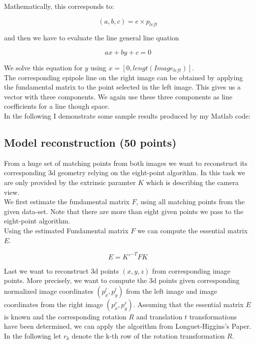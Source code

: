 \documentclass{paper}
\begin{document}
Mathematically, this corresponds to:

\begin{equation}
    (a,b,c) = e \times p_{left}
\end{equation}

and then we have to evaluate the line general line quation 

\begin{equation}
    ax + by + c = 0
\end{equation}

We solve this equation for $y$ using $x = [0,lengt(Image_{left})]$. \\

The corresponding epipole line on the right image can be obtained by applying the fundamental matrix to the point selected in the left image. This gives us a vector with three components. We again use these three components as line coefficients for a line though space. \\

In the following I demonstrate some sample results produced by my Matlab code:






 




\subsection{Model reconstruction (50 points)}

From a huge set of matching points from both images we want to reconstruct its corresponding 3d geometry relying on the eight-point algorithm. In this task we are only provided by the extrinsic paramter $K$ which is describing the camera view. \\

We first estimate the fundamental matrix $F$, using all matching points from the given data-set. Note that there are more than eight given points we pass to the eight-point algorithm. \\

Using the estimated Fundamental matrix $F$ we can compute the essential matrix $E$.

\begin{equation}
    E = K'^{-T} F K
\end{equation}



Last we want to reconstruct 3d points $(x,y,z)$ from corresponding image points. More precisely, we want to compute the 3d points given corresponding normalized image coordinates $(p^{l}_{x}, p^{l}_{y})$ from the left image and image coordinates from the right image $(p^{r}_{x}, p^{r}_{y})$. Assuming that the essential matrix $E$ is known and the corresponding rotation $R$ and translation $t$ transformations have been determined, we can apply the algorithm from Longuet-Higgins's Paper. \\

In the following let $r_k$ denote the k-th row of the rotation transformation $R$.
\end{document}
